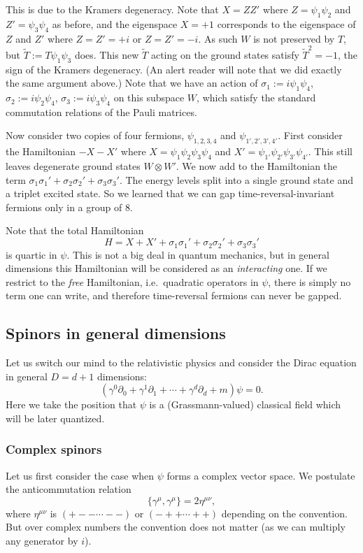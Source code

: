 \documentclass[12pt]{article}
\numberwithin{equation}{section}
\numberwithin{figure}{section}
\theoremstyle{remark}
\begin{document}
This is due to the Kramers degeneracy. 
Note that $X=ZZ'$ where $Z=\psi_1\psi_2$ and $Z'=\psi_3\psi_4$ as before,
and the eigenspace $X=+1$ corresponds to the eigenspace of $Z$ and $Z'$ 
where $Z=Z'=+i$ or $Z=Z'=-i$. 
As such $W$ is not preserved by $T$, but $\tilde T:=T\psi_1\psi_3$ does.
This new $\tilde T$ acting on the ground states satisfy $\tilde T^2=-1$,
the sign of the Kramers degeneracy.
(An alert reader will note that we did exactly the same argument above.)
Note that we have an action of $\sigma_1:=i\psi_1\psi_4$, 
$\sigma_2:=i\psi_2\psi_4$, $\sigma_3:=i\psi_3\psi_4$ on this subspace $W$,
which satisfy the standard commutation relations of the Pauli matrices.

Now consider two copies of four fermions, $\psi_{1,2,3,4}$ and $\psi_{1',2',3',4'}$.
First consider the Hamiltonian $-X-X'$ where $X=\psi_1\psi_2\psi_3\psi_4$ and 
$X'=\psi_{1'} \psi_{2'}\psi_{3'}\psi_{4'}$.
This still leaves degenerate ground states $W\otimes W'$.
We now add to the Hamiltonian the term $\sigma_1 \sigma_1' +\sigma_2 \sigma_2'+\sigma_3 \sigma_3'$. 
The energy levels split into a single ground state and a triplet excited state.
So we learned that we can gap time-reversal-invariant fermions only in a group of 8.

Note that the total Hamiltonian  \begin{equation}
H=X+X'+\sigma_1 \sigma_1' +\sigma_2 \sigma_2'+\sigma_3 \sigma_3'
\end{equation} is quartic in $\psi$. 
This is not a big deal in quantum mechanics, but in general dimensions this Hamiltonian 
will be considered as an \emph{interacting} one.
If we restrict to the \emph{free} Hamiltonian, i.e.~quadratic operators in $\psi$,
there is simply no term one can write,
and therefore time-reversal fermions can never be gapped.


\subsection{Spinors in general dimensions}

Let us switch our mind to the relativistic physics and consider the Dirac equation 
in general $D=d+1$ dimensions: \begin{equation}
(\gamma^0\partial_0 + \gamma^1\partial_1+\cdots+\gamma^d\partial_d + m ) \psi=0.
\end{equation}
Here we take the position that $\psi$ is a (Grassmann-valued) classical field 
which will be later quantized.

\subsubsection{Complex spinors}
Let us first consider the case when $\psi$ forms a complex vector space.
We postulate the anticommutation relation \begin{equation}
\{\gamma^\mu ,\gamma^\mu\} = 2\eta^{\mu\nu},
\end{equation} where $\eta^{\mu\nu}$ is $(+--\cdots--)$ or $(-++\cdots++)$ 
depending on the convention.
But over complex numbers the convention does not matter 
(as we can multiply any generator by $i$).
\end{document}
